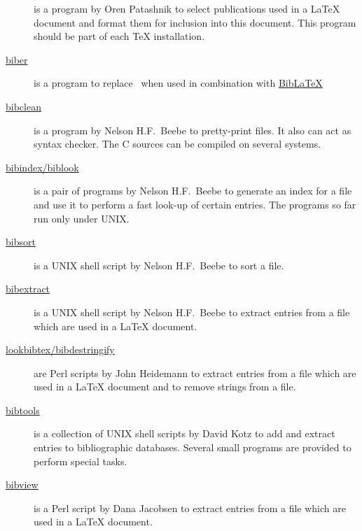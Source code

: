 \documentclass[11pt,a4paper]{scrbook}
\makeatletter
\newcommand\bibLaTeX{Bib\-\LaTeX\index{biblatex@Bib\-\LaTeX}}
\makeatother
\begin{document}
\begin{description}
\item
  [\href{https://www.ctan.org/pkg/bibtex}{\BibTeX}] is
  a program by Oren Patashnik to select publications used in a \LaTeX{}
  document and format them for inclusion into this document. This program
  should be part of each \TeX{} installation.

\item
  [\href{https://www.ctan.org/pkg/biber}{biber}] is a program to replace
  \BibTeX\ when used in combination with
  \href{https://www.ctan.org/pkg/biblatex/}{\bibLaTeX}
  
\item
  [\href{https://www.ctan.org/pkg/bibclean}{bibclean}]
  is a program by Nelson H.F.~Beebe to pretty-print \BibTeX{} files. It also
  can act as syntax checker. The C sources can be compiled on several systems.
  
\item
  [\href{https://www.ctan.org/pkg/biblook}{bibindex/biblook}]
  is a pair of programs by Nelson H.F.~Beebe to generate an index for a
  \BibTeX{} file and use it to perform a fast look-up of certain entries. The
  programs so far run only under UNIX.
    
\item
  [\href{https://www.ctan.org/pkg/bibsort}{bibsort}]
  is a UNIX shell script by Nelson H.F.~Beebe to sort a \BibTeX{} file.
  
\item
  [\href{https://www.ctan.org/pkg/bibextract}{bibextract}]
  is a UNIX shell script by Nelson H.F.~Beebe to extract entries from a
  \BibTeX{} file which are used in a \LaTeX{} document.
    
\item
  [\href{https://www.ctan.org/pkg/lookbibtex}{lookbibtex/bibdestringify}]
    are Perl scripts by John Heidemann to extract entries from a \BibTeX{}
    file which are used in a \LaTeX{} document and to remove strings from a
    \BibTeX{} file.
    
\item
  [\href{https://www.ctan.org/pkg/bibtools}{bibtools}]
  is a collection of UNIX shell scripts by David Kotz to add and extract
  entries to bibliographic databases. Several small programs are provided to
  perform special tasks.
    
\item
  [\href{https://www.ctan.org/pkg/bibview}{bibview}]
  is a Perl script by Dana Jacobsen to extract entries from a \BibTeX{} file
  which are used in a \LaTeX{} document.
    

\end{description}
\end{document}
